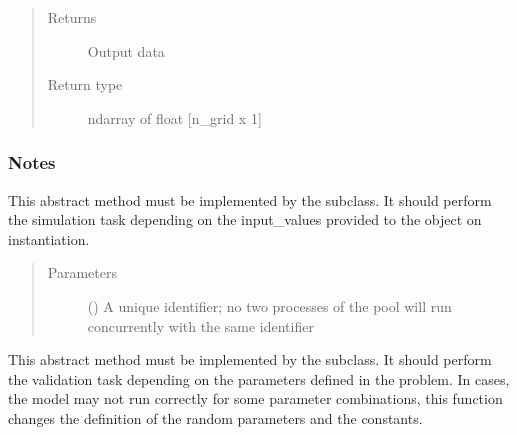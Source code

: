 \documentclass[letterpaper,10pt,english,openany,oneside]{sphinxmanual}
\begin{document}
\begin{fulllineitems}
\begin{quote}
\begin{description}
\begin{itemize}
\end{itemize}

\item[{Returns}] \leavevmode
{} \textendash{} Output data

\item[{Return type}] \leavevmode
ndarray of float {[}n\_grid x 1{]}

\end{description}\end{quote}
\subsubsection*{Notes}

\begin{figure}[htbp]
\centering

\noindent{}
\end{figure}

\begin{fulllineitems}
\label{\detokenize{pygpc.testfunctions:pygpc.testfunctions.testfunctions.SphereFun.simulate}}
This abstract method must be implemented by the subclass.
It should perform the simulation task depending on the input\_values provided to the object on instantiation.
\begin{quote}\begin{description}
\item[{Parameters}] \leavevmode
{} () \textendash{} A unique identifier; no two processes of the pool will run concurrently with the same identifier

\end{description}\end{quote}

\end{fulllineitems}


\begin{fulllineitems}
\label{\detokenize{pygpc.testfunctions:pygpc.testfunctions.testfunctions.SphereFun.validate}}
This abstract method must be implemented by the subclass.
It should perform the validation task depending on the parameters defined in the problem.
In cases, the model may not run correctly for some parameter combinations, this function changes the definition
of the random parameters and the constants.

\end{fulllineitems}


\end{fulllineitems}
\end{document}
